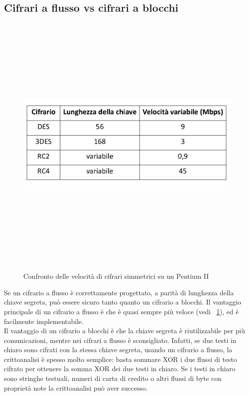 \subsection{Cifrari a flusso vs cifrari a blocchi}
\begin{figure}[htbp]
	\centering%
	\subfigure%
	{\includegraphics[height=13cm, width=13cm, keepaspectratio]{Immagini/Capitolo2/flusso_vel.png}}
	\caption{Confronto delle velocità di cifrari simmetrici su un Pentium II \label{fig:flusso_vel}} 	
\end{figure}
Se un cifrario a flusso è correttamente progettato, a parità di lunghezza della chiave segreta, può essere sicuro tanto quanto un cifrario a blocchi. Il vantaggio principale di un cifrario a flusso è che è quasi sempre più veloce (vedi \figurename ~\ref{fig:flusso_vel}), ed è facilmente implementabile.\\

Il vantaggio di un cifrario a blocchi è che la chiave segreta è riutilizzabile per più comunicazioni, mentre nei cifrari a flusso è sconsigliato. Infatti, se due testi in chiaro sono cifrati con la stessa chiave segreta, usando un cifrario a flusso, la crittoanalisi è spesso molto semplice: basta sommare XOR i due flussi di testo cifrato per ottenere la somma XOR dei due testi in chiaro. Se i testi in chiaro sono stringhe testuali, numeri di carta di credito o altri flussi di byte con proprietà note la crittoanalisi può aver successo.

